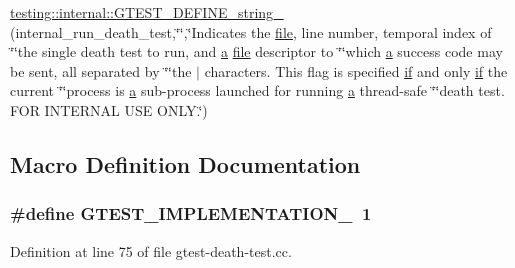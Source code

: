 \begin{DoxyCompactItemize}
\hyperlink{namespacetesting_1_1internal_a1b4d550272b7346726a5b4976d5c7aca}{testing\+::internal\+::\+G\+T\+E\+S\+T\+\_\+\+D\+E\+F\+I\+N\+E\+\_\+string\+\_\+} (internal\+\_\+run\+\_\+death\+\_\+test,\char`\"{}\char`\"{},\char`\"{}Indicates the \hyperlink{_07copy_08_2_read_camera_model_8m_a151631b2fd2bb776ef06c9f440a7ed74}{file}, line number, temporal index of \char`\"{}\char`\"{}the single death test to run, and \hyperlink{_07copy_08_2_read_camera_model_8m_a551a3d351eadcc0b9b1a2f24f0fb5ea0}{a} \hyperlink{_07copy_08_2_read_camera_model_8m_a151631b2fd2bb776ef06c9f440a7ed74}{file} descriptor to \char`\"{}\char`\"{}which \hyperlink{_07copy_08_2_read_camera_model_8m_a551a3d351eadcc0b9b1a2f24f0fb5ea0}{a} success code may be sent, all separated by \char`\"{}\char`\"{}the \textquotesingle{}$\vert$\textquotesingle{} characters.  This flag is specified \hyperlink{jquery_8js_a42cbfadee2b4749e8f699ea8d745a0e4}{if} and only \hyperlink{jquery_8js_a42cbfadee2b4749e8f699ea8d745a0e4}{if} the current \char`\"{}\char`\"{}process is \hyperlink{_07copy_08_2_read_camera_model_8m_a551a3d351eadcc0b9b1a2f24f0fb5ea0}{a} sub-\/process launched for running \hyperlink{_07copy_08_2_read_camera_model_8m_a551a3d351eadcc0b9b1a2f24f0fb5ea0}{a} thread-\/safe \char`\"{}\char`\"{}death test.  F\+OR I\+N\+T\+E\+R\+N\+AL U\+SE O\+N\+L\+Y.\char`\"{})
\end{DoxyCompactItemize}


\subsection{Macro Definition Documentation}
\subsubsection[{\texorpdfstring{G\+T\+E\+S\+T\+\_\+\+I\+M\+P\+L\+E\+M\+E\+N\+T\+A\+T\+I\+O\+N\+\_\+}{GTEST_IMPLEMENTATION_}}]{\setlength{\rightskip}{0pt plus 5cm}\#define G\+T\+E\+S\+T\+\_\+\+I\+M\+P\+L\+E\+M\+E\+N\+T\+A\+T\+I\+O\+N\+\_\+~1}\hypertarget{gtest-death-test_8cc_a83bd232fd1077579fada92c31bb7469f}{}\label{gtest-death-test_8cc_a83bd232fd1077579fada92c31bb7469f}


Definition at line 75 of file gtest-\/death-\/test.\+cc.

